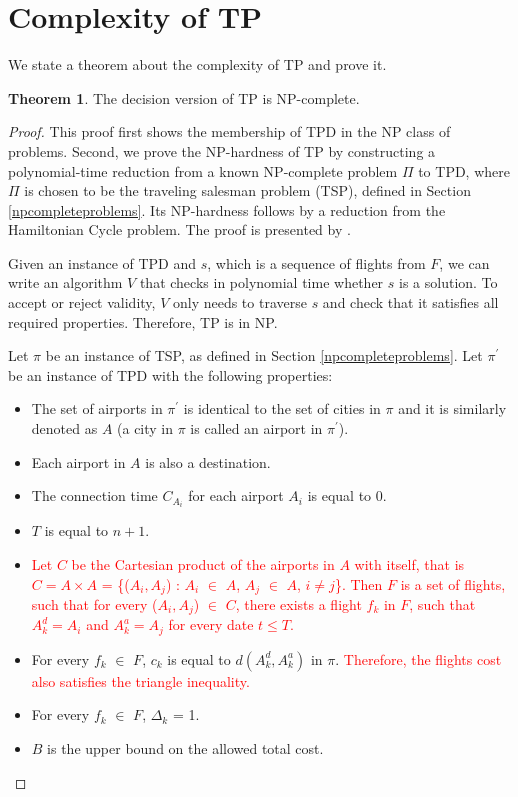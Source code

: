 \documentclass{article}
\theoremstyle{definition}
\newtheorem{theorem}{Theorem}
\begin{document}
\section{Complexity of TP}

We state a theorem about the complexity of TP and prove it.

\begin{theorem}
The decision version of TP is NP-complete.
\end{theorem}

\begin{proof}
\label{npcompleteproof}
This proof first shows the membership of TPD in the NP class of problems. Second, we prove the NP-hardness of TP by constructing a polynomial-time reduction from a known NP-complete problem $\Pi$ to TPD, where $\Pi$ is chosen to be the traveling salesman problem (TSP), defined in Section \ref{npcompleteproblems}. Its NP-hardness follows by a reduction from the Hamiltonian Cycle problem. The proof is presented by \cite{thebible}.

Given an instance of TPD and $s$, which is a sequence of flights from $F$, we can write an algorithm $V$ that checks in polynomial time whether $s$ is a solution. To accept or reject validity, $V$ only needs to traverse $s$ and check that it satisfies all required properties. Therefore, TP is in NP.

Let $\pi$ be an instance of TSP, as defined in Section \ref{npcompleteproblems}. Let $\pi^{\prime}$ be an instance of TPD with the following properties:
\begin{itemize}
\item The set of airports in $\pi^{\prime}$ is identical to the set of cities in $\pi$ and it is similarly denoted as $A$ (a city in $\pi$ is called an airport in $\pi^{\prime}$).
\item Each airport in $A$ is also a destination.
\item The connection time $C_{A_{i}}$ for each airport $A_{i}$ is equal to 0.
\item $T$ is equal to $n+1$.
\item \textcolor{red}{Let $C$ be the Cartesian product of the airports in $A$ with itself, that is $C = A \times A$ = \{($A_{i}, A_{j}$) : $A_{i}$ $\in$ $A$, $A_{j}$ $\in$ $A$, $i \neq j$\}. Then $F$ is a set of flights, such that for every ($A_{i}, A_{j}$) $\in$ $C$, there exists a flight $f_{k}$ in $F$, such that $A^{d}_{k} = A_{i}$ and $A^{a}_{k} = A_{j}$ for every date $t \leq T$.}
\item For every $f_{k}$ $\in$ $F$, $c_{k}$ is equal to $d(A^{d}_{k}, A^{a}_{k})$ in $\pi$. \textcolor{red}{Therefore, the flights cost also satisfies the triangle inequality.} 
\item For every $f_{k}$ $\in$ $F$, $\Delta_{k}$ = 1.
\item $B$ is the upper bound on the allowed total cost.
\end{itemize}


\end{proof}
\end{document}
